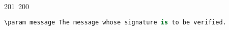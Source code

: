 201~200~\documentclass{article}
\begin{document}
\begin{lstlisting}[language=Python, caption=Signing and Verifying Messages]
	                                                                                                                                                                                                                                                                                                	                                                                                                                                        	    	                                                                                                	                                                                                                                                                                                                                                                                                                                                	                                                                        	                                                                        	                                                                                                                                        	                                                                                                                                                                                                                        	                                                                                                                            	                                        \param message The message whose signature is to be verified.
	                                                                                                                                                                                                                                                                                                	                                                                                                                                        	    	                                                                                                	                                                                                                                                                                                                                                                                                                                                	                                                                        	                                                                        	                                                                                                                                        	                                                                                                                                                                                                                        	                                                                                                                            	                                            \param signature The signature to be verified.

\end{lstlisting}
\end{document}
